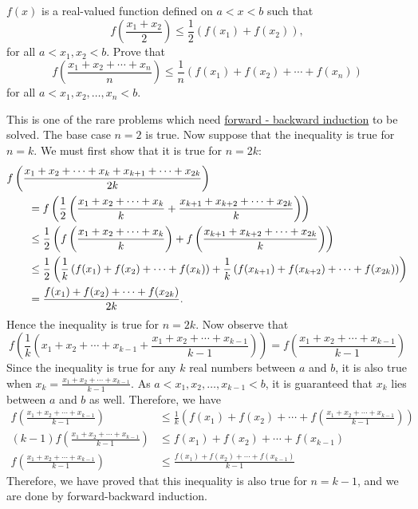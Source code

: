 \begin{question}
    $f(x)$ is a real-valued function defined on $a < x < b$ such that 
    \[f\left( \frac{x_{1} + x_{2}}{2} \right) \leq \frac{1}{2}(f(x_{1}) + f(x_{2})),\] 
    for all $a < x_{1}, x_{2} < b$. Prove that 
    \[f\left(\frac{x_{1} + x_{2} + \cdots + x_{n}}{n}\right)\leq \frac{1}{n}(f(x_{1}) + f(x_{2}) + \cdots + f(x_{n}))\] 
    for all $a < x_{1}, x_{2}, \ldots, x_{n} < b$.
\end{question}
\begin{solution}
    This is one of the rare problems which need \hyperref[teq:
    f.b.induction]{forward - backward induction} to be solved. The base case $n
    = 2$ is true. Now suppose that the inequality is true for $n = k$. We must
    first show that it is true for $n = 2k$:
    \begin{align*}
        \MoveEqLeft
    f\left( \frac{x_1 + x_2 + \cdots + x_k + x_{k + 1} + \cdots + x_{2k}}{2k} \right)\\
        &= f\left( \frac{1}{2} \left( \dfrac{x_1 + x_2 + \cdots + x_k}{k} + \dfrac{x_{k + 1} + x_{k + 2} + \cdots + x_{2k}}{k} \right) \right)\\
        &\leq \frac{1}{2}\left( f\left( \frac{x_1 + x_2 + \cdots + x_k}{k} \right) + f\left( \frac{x_{k + 1} + x_{k + 2} + \cdots + x_{2k}}{k} \right) \right) \\
        &\leq \frac{1}{2} \left( \frac{1}{k} \left( f(x_1) + f(x_2) + \cdots + f(x_k) \right) + \frac{1}{k} \left( f(x_{k + 1}) + f(x_{k + 2}) + \cdots + f(x_{2k}) \right) \right) \\
        &= \frac{f(x_1) + f(x_2) + \cdots + f(x_{2k})}{2k}.
    \end{align*}
    Hence the inequality is true for $n = 2k$. Now observe that
    \[
        f \left( \frac{1}{k} \left( x_1 + x_2 + \cdots + x_{k - 1} + \frac{x_1 + x_2 + \cdots + x_{k - 1}}{k - 1} \right) \right) = f \left( \frac{x_1 + x_2 + \cdots + x_{k - 1}}{k - 1} \right)
    \]
    Since the inequality is true for any $k$ real numbers between $a$ and $b$,
    it is also true when $x_k = \frac{x_1 + x_2 + \cdots + x_{k - 1}}{k - 1}$.
    As $a < x_1, x_2, \ldots, x_{k - 1} < b$, it is guaranteed that $x_k$ lies
    between $a$ and $b$ as well.
    Therefore, we have
    \begin{align*}
        f \left( \frac{x_1 + x_2 + \cdots + x_{k - 1}}{k - 1} \right) &\leq \frac{1}{k} \left( f(x_1) + f(x_2) + \cdots + f\left( \frac{x_1 + x_2 + \cdots + x_{k - 1}}{k - 1} \right) \right)\\
        (k - 1) f \left( \frac{x_1 + x_2 + \cdots + x_{k - 1}}{k - 1} \right) &\leq f(x_1) + f(x_2) + \cdots + f(x_{k - 1})\\
        f \left( \frac{x_1 + x_2 + \cdots + x_{k - 1}}{k - 1} \right) &\leq \frac{f(x_1) + f(x_2) + \cdots + f(x_{k - 1})}{k - 1}
    \end{align*}
    Therefore, we have proved that this inequality is also true for $n = k -
    1$, and we are done by forward-backward induction.
\end{solution}


